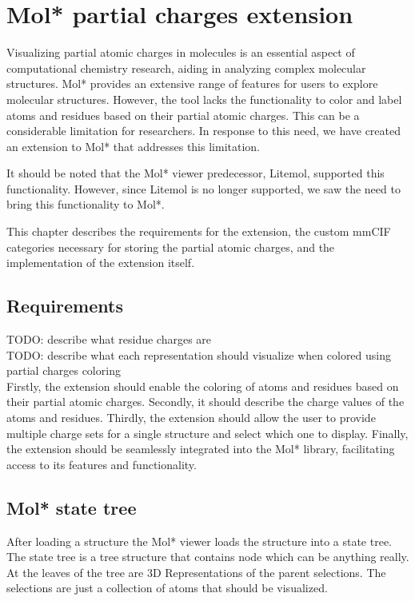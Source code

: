 \documentclass[
  digital,     %
  oneside,     %
  nosansbold,  %
  nocolorbold, %
  lof,         %
  lot,         %
]{fithesis4}
\begin{document}
\chapter{Mol* partial charges extension}
\label{chapter:molstar_partial_charges_extension}

Visualizing partial atomic charges in molecules is an essential aspect of computational chemistry research, aiding in analyzing complex molecular structures. Mol* provides an extensive range of features for users to explore molecular structures. However, the tool lacks the functionality to color and label atoms and residues based on their partial atomic charges.
This can be a considerable limitation for researchers. In response to this need, we have created an extension to Mol* that addresses this limitation.

It should be noted that the Mol* viewer predecessor, Litemol, supported this functionality. However, since Litemol is no longer supported, we saw the need to bring this functionality to Mol*.

This chapter describes the requirements for the extension, the custom mmCIF categories necessary for storing the partial atomic charges, and the implementation of the extension itself.

\section{Requirements}
\label{section:requirements}

TODO: describe what residue charges are \\
TODO: describe what each representation should visualize when colored using partial charges coloring \\

Firstly, the extension should enable the coloring of atoms and residues based on their partial atomic charges. Secondly, it should describe the charge values of the atoms and residues. Thirdly, the extension should allow the user to provide multiple charge sets for a single structure and select which one to display. Finally, the extension should be seamlessly integrated into the Mol* library, facilitating access to its features and functionality.

\section{Mol* state tree}

After loading a structure the Mol* viewer loads the structure into a state tree. The state tree is a tree structure that contains node which can be anything really. At the leaves of the tree are 3D Representations of the parent selections. The selections are just a collection of atoms that should be visualized.
\end{document}
